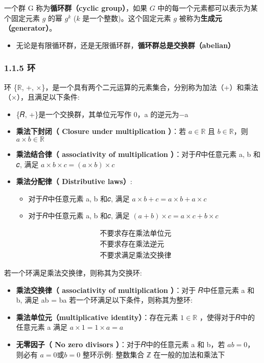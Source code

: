 一个群 G 称为\textbf{循环群（cyclic group）}，如果 \(G\)
中的每一个元素都可以表示为某个固定元素 \(g\) 的幂 \(g^k\) (\(k\)
是一个整数)。这个固定元素 \(g\) 被称为\textbf{生成元（generator）}。

\begin{itemize}
\tightlist
\item
  无论是有限循环群，还是无限循环群，\textbf{循环群总是交换群（abelian）}
\end{itemize}

\subsubsection{1.1.5 环}\label{ux73af}

环 \{\(\mathbb{R}\), +,
×\}，是一个具有两个二元运算的元素集合，分别称为加法（+）和乘法（×），且满足以下条件:

\begin{itemize}
\tightlist
\item
  \{𝑅, +\}是一个交换群，其单位元写作 0，a 的逆元为−a
\item
  \textbf{乘法下封闭（ Closure under multiplication ）}：若
  \(a \in \mathbb{R}\) 且 \(b \in \mathbb{R}\)，则
  \(a×b \in \mathbb{R}\)
\item
  \textbf{乘法结合律（ associativity of multiplication
  ）}：对于𝑅中任意元素 a, b 和𝑐, 满足 \(a× b×𝑐 = (a×b)×𝑐\)
\item
  \textbf{乘法分配律（ Distributive laws）}:

  \begin{itemize}
  \tightlist
  \item
    对于𝑅中任意元素 a, b 和𝑐, 满足 \(a× b + 𝑐 = a×b + a×𝑐\)
  \item
    对于𝑅中任意元素 a, b 和𝑐, 满足 \((a + b)×𝑐 = a×𝑐 + b×𝑐\)
  \end{itemize}
\end{itemize}

\[
\begin{matrix}
&不要求存在乘法单位元 \\
&不要求存在乘法逆元 \\
&不要求满足乘法交换律
\end{matrix}
\]

若一个环满足乘法交换律，则称其为交换环:

\begin{itemize}
\tightlist
\item
  \textbf{乘法交换律（ associativity of multiplication ）}：对于
  𝑅中任意元素 a 和 b, 满足 ab = ba 若一个环满足以下条件，则称其为整环:
\item
  \textbf{乘法单位元（multiplicative identity）}：存在元素
  \(1 \in \mathbb{R}\) ，使得对于𝑅中的任意元素 a 满足 \(a×1 = 1×a = a\)
\item
  \textbf{无零因子（ No zero divisors ）}：对于𝑅中的任意元素 a 和 b，若
  \(ab = 0\)，则必有 \(a = 0 或 b = 0\) 整环示例: 整数集合 ℤ
  在一般的加法和乘法下
\end{itemize}

